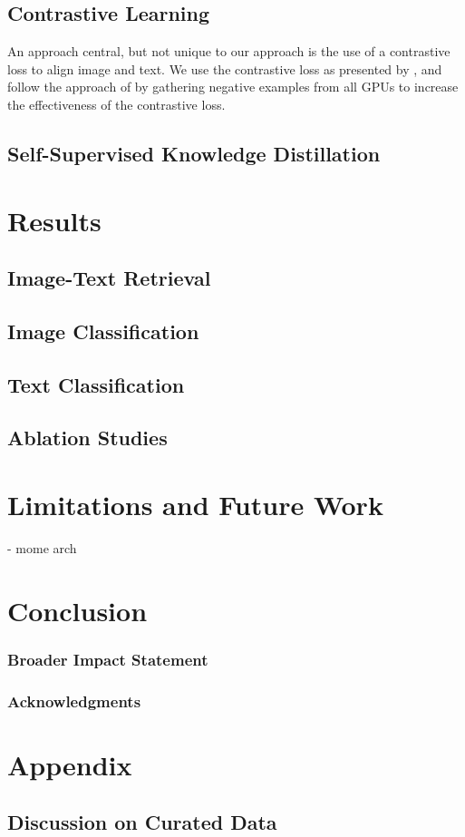 \documentclass[10pt]{article} %
\begin{document}
\subsection{Contrastive Learning}
An approach central, but not unique to our approach is the use of a contrastive loss to align image and text. We use the contrastive loss
as presented by \citet{clip}, and follow the approach of \citet{vlmo} by gathering negative examples from all GPUs to increase the
effectiveness of the contrastive loss.

\subsection{Self-Supervised Knowledge Distillation}



\section{Results}
\subsection{Image-Text Retrieval}
\subsection{Image Classification}
\subsection{Text Classification}
\subsection{Ablation Studies}
\section{Limitations and Future Work}
- mome arch
\section{Conclusion}


\subsubsection*{Broader Impact Statement}




\subsubsection*{Acknowledgments}





\appendix
\section{Appendix}
\subsection{Discussion on Curated Data} \label{curated_data}
\end{document}

